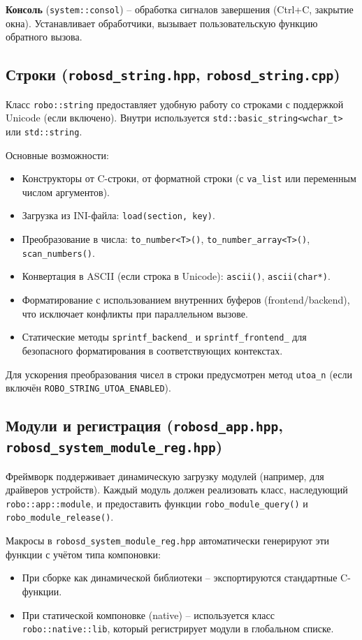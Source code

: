 \documentclass[a4paper,12pt]{article}
\begin{document}
\textbf{Консоль} (\texttt{system::consol}) -- обработка сигналов завершения (Ctrl+C, закрытие окна). Устанавливает обработчики, вызывает пользовательскую функцию обратного вызова.

\subsection{Строки (\texttt{robosd\_string.hpp}, \texttt{robosd\_string.cpp})}

Класс \texttt{robo::string} предоставляет удобную работу со строками с поддержкой Unicode (если включено). Внутри используется \texttt{std::basic\_string<wchar\_t>} или \texttt{std::string}.

Основные возможности:
\begin{itemize}
    \item Конструкторы от C-строки, от форматной строки (с \texttt{va\_list} или переменным числом аргументов).
    \item Загрузка из INI-файла: \texttt{load(section, key)}.
    \item Преобразование в числа: \texttt{to\_number<T>()}, \texttt{to\_number\_array<T>()}, \texttt{scan\_numbers()}.
    \item Конвертация в ASCII (если строка в Unicode): \texttt{ascii()}, \texttt{ascii(char*)}.
    \item Форматирование с использованием внутренних буферов (frontend/backend), что исключает конфликты при параллельном вызове.
    \item Статические методы \texttt{sprintf\_backend\_} и \texttt{sprintf\_frontend\_} для безопасного форматирования в соответствующих контекстах.
\end{itemize}

Для ускорения преобразования чисел в строки предусмотрен метод \texttt{utoa\_n} (если включён \texttt{ROBO\_STRING\_UTOA\_ENABLED}).

\subsection{Модули и регистрация (\texttt{robosd\_app.hpp}, \texttt{robosd\_system\_module\_reg.hpp})}

Фреймворк поддерживает динамическую загрузку модулей (например, для драйверов устройств). Каждый модуль должен реализовать класс, наследующий \texttt{robo::app::module}, и предоставить функции \texttt{robo\_module\_query()} и \texttt{robo\_module\_release()}.

Макросы в \texttt{robosd\_system\_module\_reg.hpp} автоматически генерируют эти функции с учётом типа компоновки:
\begin{itemize}
    \item При сборке как динамической библиотеки -- экспортируются стандартные C-функции.
    \item При статической компоновке (native) -- используется класс \texttt{robo::native::lib}, который регистрирует модули в глобальном списке.
\end{itemize}
\end{document}
